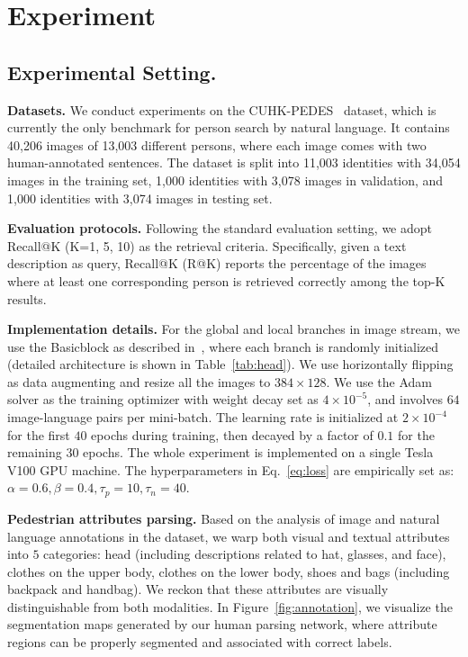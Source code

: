 \documentclass[runningheads]{llncs}
\begin{document}
\section{Experiment}
\subsection{Experimental Setting.}
\noindent\textbf{Datasets.} We conduct experiments on the CUHK-PEDES~\cite{li2017person} dataset, which is currently the only benchmark for person search by natural language. It contains 40,206 images of 13,003 different persons, where each image comes with two human-annotated sentences. The dataset is split into 11,003 identities with 34,054 images in the training set, 1,000 identities with 3,078 images in validation, and 1,000 identities with 3,074 images in testing set.

\noindent\textbf{Evaluation protocols.} Following the standard evaluation setting, we adopt Recall@K (K=1, 5, 10) as the retrieval criteria. Specifically, given a text description as query, Recall@K (R@K) reports the percentage of the images where at least one corresponding person is retrieved correctly among the top-K results.

\noindent\textbf{Implementation details.} For the global and local branches in image stream, we use the Basicblock as described in~\cite{he2016deep}, where each branch is randomly initialized (detailed architecture is shown in Table~\ref{tab:head}). We use horizontally flipping as data augmenting and resize all the images to $384\times128$.
We use the Adam solver as the training optimizer with weight decay set as $4\times10^{-5}$, and involves $64$ image-language pairs per mini-batch. The learning rate is initialized at $2\times10^{-4}$ for the first $40$ epochs during training, then decayed by a factor of $0.1$ for the remaining $30$ epochs. The whole experiment is implemented on a single Tesla V100 GPU machine. The hyperparameters in Eq.~\ref{eq:loss} are empirically set as: $\alpha=0.6,\beta=0.4,\tau_p=10,\tau_n=40$.

\noindent\textbf{Pedestrian attributes parsing.}
Based on the analysis of image and natural language annotations in the dataset, we warp both visual and textual attributes into $5$ categories: head (including descriptions related to hat, glasses, and face), clothes on the upper body, clothes on the lower body, shoes and bags (including backpack and handbag).
We reckon that these attributes are visually distinguishable from both modalities. In Figure~\ref{fig:annotation}, we visualize the segmentation maps generated by our human parsing network, where attribute regions can be properly segmented and associated with correct labels.
\end{document}

